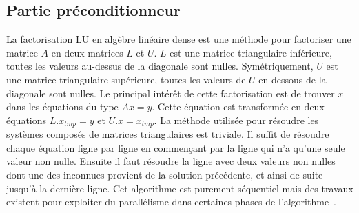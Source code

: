 \subsection{Partie préconditionneur}
La factorisation LU en algèbre linéaire dense est une méthode pour factoriser une matrice $A$ en deux matrices $L$ et $U$.
%
$L$ est une matrice triangulaire inférieure, toutes les valeurs au-dessus de la diagonale sont nulles.
%
Symétriquement, $U$ est une matrice triangulaire supérieure, toutes les valeurs de $U$ en dessous de la diagonale sont nulles.
%
Le principal intérêt de cette factorisation est de trouver $x$ dans les équations du type $Ax=y$.
%
Cette équation est transformée en deux équations $L.x_{tmp}=y$ et $U.x=x_{tmp}$.
%
La méthode utilisée pour résoudre les systèmes composés de matrices triangulaires est triviale.
%
Il suffit de résoudre chaque équation ligne par ligne en commençant par la ligne qui n'a qu'une seule valeur non nulle.
%
Ensuite il faut résoudre la ligne avec deux valeurs non nulles dont une des inconnues provient de la solution précédente, et ainsi de suite jusqu'à la dernière ligne.
%
Cet algorithme est purement séquentiel mais des travaux existent pour exploiter du parallélisme dans certaines phases de l'algorithme~\cite{plasma_lu}.



